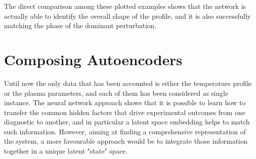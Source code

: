 The direct comparison among these plotted examples shows that the network is actually able to identify the overall shape of the profile, and it is also successfully matching the phase of the dominant perturbation. 


\section{Composing Autoencoders}

Until now the only data that has been accounted is either the temperature profile or the plasma parameters, and each of them has been considered as single instance. The neural network approach shows that it is possible to learn how to transfer the common hidden factors that drive experimental outcomes from one diagnostic to another, and in particular a latent space embedding helps to match such information.
However, aiming at finding a comprehensive representation of the system, a more favourable approach would be to integrate those information together in a unique latent "state" space.

